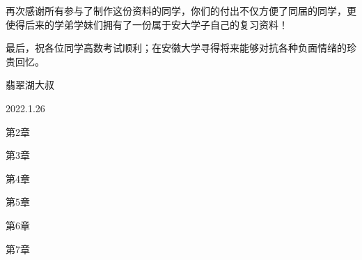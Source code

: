 \documentclass{article}
\begin{document}
	再次感谢所有参与了制作这份资料的同学，你们的付出不仅方便了同届的同学，更使得后来的学弟学妹们拥有了一份属于安大学子自己的复习资料！
	
	最后，祝各位同学高数考试顺利；在安徽大学寻得将来能够对抗各种负面情绪的珍贵回忆。
	
	\vskip 3cm
	\hfill 翡翠湖大叔
	
	\hfill 2022.1.26
	
	
	
	\newpage
	\mbox{}
	\vspace{4cm}
	\begin{center}
		第2章
	\end{center}
	
	
	\newpage
	\mbox{}
	\vspace{4cm}
	\begin{center}
		第3章
	\end{center}
	
	
	\newpage
	\mbox{}
	\vspace{4cm}
	\begin{center}
		第4章
	\end{center}
	
	
	\newpage
	\mbox{}
	\vspace{4cm}
	\begin{center}
		第5章
	\end{center}
	
	
	\newpage
	\mbox{}
	\vspace{4cm}
	\begin{center}
		第6章
	\end{center}
	
	
	\newpage
	\mbox{}
	\vspace{4cm}
	\begin{center}
		第7章
	\end{center}
	
\end{document}
